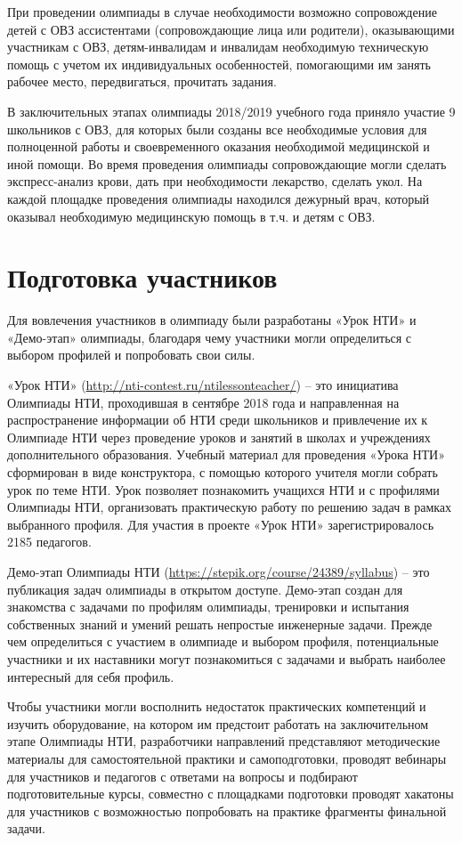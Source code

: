 При проведении олимпиады в случае необходимости возможно сопровождение детей с ОВЗ ассистентами (сопровождающие лица или родители), оказывающими участникам с ОВЗ, детям-инвалидам и инвалидам необходимую техническую помощь с учетом их индивидуальных особенностей, помогающими им занять рабочее место, передвигаться, прочитать задания. 

В заключительных этапах олимпиады 2018/2019 учебного года приняло участие 9 школьников с ОВЗ, для которых были созданы все необходимые условия для полноценной работы и своевременного оказания необходимой медицинской и иной помощи. Во время проведения олимпиады сопровождающие могли сделать экспресс-анализ крови, дать при необходимости лекарство, сделать укол. На каждой площадке проведения олимпиады находился дежурный врач, который оказывал необходимую медицинскую помощь в т.ч. и детям с ОВЗ.

\section*{Подготовка участников}

Для вовлечения участников в олимпиаду были разработаны «Урок НТИ» и «Демо-этап» олимпиады, благодаря чему участники могли определиться с выбором профилей и попробовать свои силы.

«Урок НТИ» (\url{http://nti-contest.ru/ntilessonteacher/}) – это инициатива Олимпиады НТИ, проходившая в сентябре 2018 года и направленная на распространение информации об НТИ среди школьников и привлечение их к Олимпиаде НТИ через проведение уроков и занятий в школах и учреждениях дополнительного образования. Учебный материал для проведения «Урока НТИ» сформирован в виде конструктора, с помощью которого учителя могли собрать урок по теме НТИ. Урок позволяет познакомить учащихся НТИ и  с профилями Олимпиады НТИ, организовать практическую работу по решению задач в рамках выбранного профиля. Для участия в проекте «Урок НТИ» зарегистрировалось 2185 педагогов.

Демо-этап Олимпиады НТИ (\url{https://stepik.org/course/24389/syllabus}) – это публикация задач олимпиады в открытом доступе. Демо-этап создан для знакомства с задачами по профилям олимпиады, тренировки и испытания собственных знаний и умений решать непростые инженерные задачи.  Прежде чем определиться с участием в олимпиаде и выбором профиля,  потенциальные участники и их наставники могут познакомиться с задачами и выбрать наиболее интересный для себя профиль.

Чтобы участники могли восполнить недостаток практических компетенций и изучить оборудование, на котором им предстоит работать на заключительном этапе Олимпиады НТИ, разработчики направлений представляют методические материалы для самостоятельной практики и самоподготовки, проводят вебинары для участников и педагогов с ответами на вопросы и подбирают подготовительные курсы, совместно с площадками подготовки проводят хакатоны для участников с возможностью попробовать на практике фрагменты финальной задачи. 

